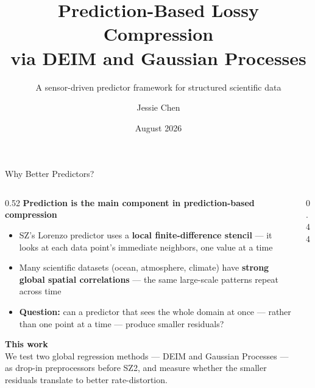 \documentclass[aspectratio=169, 11pt]{beamer}
\title{Prediction-Based Lossy Compression\\via DEIM and Gaussian Processes}
\subtitle{A sensor-driven predictor framework for structured scientific data}
\author{Jessie Chen}
\institute{Argonne National Laboratory}
\date{August 2026}
\begin{document}

\maketitle

\begin{frame}{Why Better Predictors?}
\begin{columns}[T]

\begin{column}{0.52\textwidth}
  \textcolor{cteal}{\textbf{Prediction is the main component in prediction-based compression}}\vspace{0.3em}
  \begin{itemize}\setlength\itemsep{0.3em}\small
    \item SZ's Lorenzo predictor uses a \textbf{local finite-difference stencil} --- it looks at each data point's immediate neighbors, one value at a time
    \item Many scientific datasets (ocean, atmosphere, climate) have \textbf{strong global spatial correlations} --- the same large-scale patterns repeat across time
    \item \textbf{Question:} can a predictor that sees the whole domain at once --- rather than one point at a time --- produce smaller residuals?
  \end{itemize}

  \vspace{0.5em}
  \textcolor{cteal}{\textbf{This work}}\vspace{0.2em}\\
  \small We test two global regression methods --- DEIM and Gaussian Processes --- as drop-in preprocessors before SZ2, and measure whether the smaller residuals translate to better rate-distortion.
\end{column}

\begin{column}{0.44\textwidth}
  \vspace{0.5em}


\end{column}
\end{columns}
\end{frame}
\end{document}
